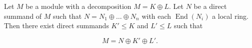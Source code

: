 Let $M$ be a module with a decomposition $M = K \oplus L$. Let $N$ be a direct summand of $M$ such that $N = N_1 \oplus \ldots \oplus N_n$ with each $\operatorname{End}(N_i)$ a local ring. Then there exist direct summands $K' \leq K$ and $L' \leq L$ such that

$$M = N \oplus K' \oplus L'.$$
